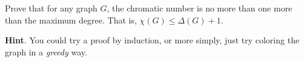 \documentclass{book}
\begin{document}
\setcounter{cpjt}{45}
\addtocounter{cpjt}{-1}
\begin{activity}\label{activity-38}
\hypertarget{p-389}{}%
Prove that for any graph \(G\), the chromatic number is no more than one more than the maximum degree.  That is, \(\chi(G) \le \Delta(G) + 1\).%
\par\smallskip%
\noindent\textbf{Hint}.\hypertarget{hint-19}{}\quad%
\hypertarget{p-390}{}%
You could try a proof by induction, or more simply, just try coloring the graph in a \emph{greedy} way.%
\end{activity}

\clearpage
\end{document}
